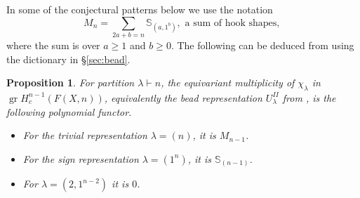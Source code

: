 \documentclass[12pt]{article}
\newcommand{\Q}{\mathbb{Q}}
\newcommand{\Specht}[1]{\chi_{#1}}
\newcommand{\TransposePartition}[1]{{#1}^{\ast}}
\newcommand{\Schur}[1]{\mathbb{S}_{#1}}
\newcommand{\MultTriv}[1]{M_{#1}}
\DeclareMathOperator{\gr}{gr}
\theoremstyle{plain}
\newtheorem{prop}[thm]{Proposition}
\theoremstyle{definition}
\theoremstyle{remark}
\begin{document}

In some of the conjectural patterns below we use the notation 
\[
\MultTriv{n} = \sum_{2a+b = n}{\Schur{{(a, 1^b)}}}, \text{ a sum of hook shapes, }
\]
where the sum is over $a\geq 1$ and $b\geq 0$. The following can be deduced from \cite[Examples 3-4 and Corollary 19.8]{PV18} using the dictionary in \S\ref{sec:bead}.

\begin{prop}\label{prop:known-mult-PV}
For partition $\lambda\vdash n$, the equivariant multiplicity of $\Specht{\lambda}$ in $\gr H^{n-1}_c(F(X,n))$, equivalently the bead representation $U_\lambda^{II}$ from \cite[\S2.5]{TW19}, is the following polynomial functor.
\begin{itemize}
    \item For the trivial representation $\lambda = (n)$, it is $\MultTriv{n-1}$.
\item For the sign representation $\lambda = (1^n)$, it is $\Schur{(n-1)}$.
\item For $\lambda = (2,1^{n-2})$ it is $0$.
\end{itemize}
\end{prop}

\end{document}
